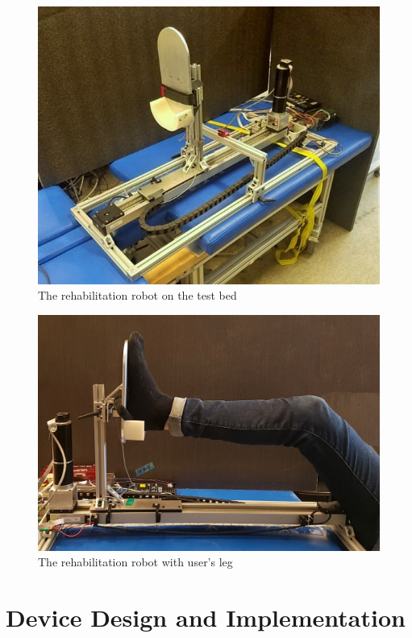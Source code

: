 \documentclass[12pt]{report}
\begin{document}
	\begin{figure}[h] 
		\centering
		\includegraphics[width=\linewidth]{device_pic1}
		\caption{The rehabilitation robot on the test bed}
		\label{fig:robot_on_bed}
	\end{figure}


	\begin{figure}[h] 
		\centering
		\includegraphics[width=\linewidth]{robot_leg}
		\caption{The rehabilitation robot with user's leg}
		\label{fig:robot_leg}
	\end{figure}
	

\afterpage{\null\newpage}
\chapter{Device Design and Implementation} \label{ch2}
\end{document}
